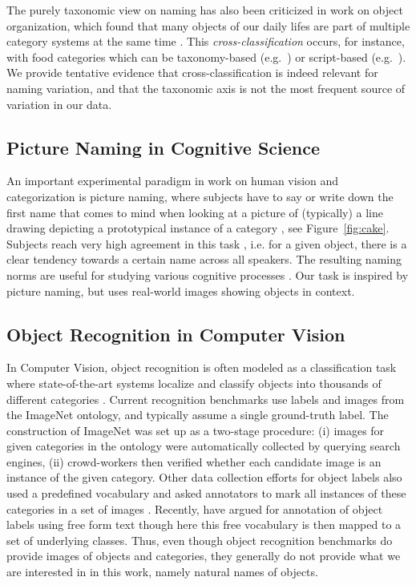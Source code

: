 The purely taxonomic view on naming has also been criticized in work on object organization, which found that many objects of our daily lifes are part of multiple category systems at the same time \cite{ross1999food,SHAFTO20111}. 
This \textit{cross-classification} occurs, for instance, with food categories which can be taxonomy-based (e.g.\ ) or script-based (e.g.\  ).
We provide tentative evidence that cross-classification is indeed relevant for naming variation, and that the taxonomic axis is not the most frequent source of variation in our data.

\subsection{Picture Naming in Cognitive Science}

An important experimental paradigm in work on human vision and categorization is picture naming, where subjects have to say or write down the first name that comes to mind when looking at a picture of (typically) a line drawing depicting a prototypical instance of a category \cite{snodgrass,rossion2004revisiting}, see Figure\ \ref{fig:cake}.
Subjects reach very high agreement in this task \cite{rossion2004revisiting}, i.e. for a given object, there is a clear tendency towards a certain name across all speakers.
The resulting naming norms are useful for studying various cognitive processes \cite{humphreys1988cascade}.
Our task is inspired by picture naming, but uses real-world images showing objects in context.

\subsection{Object Recognition in Computer Vision}

In Computer Vision, object recognition is often modeled as a classification task where state-of-the-art systems localize and classify objects into thousands of different categories  \cite{googlenet,ILSVRC15}. 
Current recognition benchmarks use labels and images from the ImageNet \cite{imagenet_cvpr09} ontology, and typically assume a single ground-truth label. 
The construction of ImageNet was set up as a two-stage procedure: (i) images for given categories in the ontology were automatically collected by querying search engines, (ii) crowd-workers then verified whether each candidate image is an instance of the given category.
Other data collection efforts for object labels also used a predefined vocabulary and asked annotators to mark all instances of these categories in a set of images \cite{mscoco,OpenImages}. 
Recently,  have argued for annotation of object labels using free form text though here this free vocabulary is then mapped to a set of underlying classes.
Thus, even though object recognition benchmarks do provide images of objects and categories, they generally do not provide what we are interested in in this work, namely natural names of objects.


